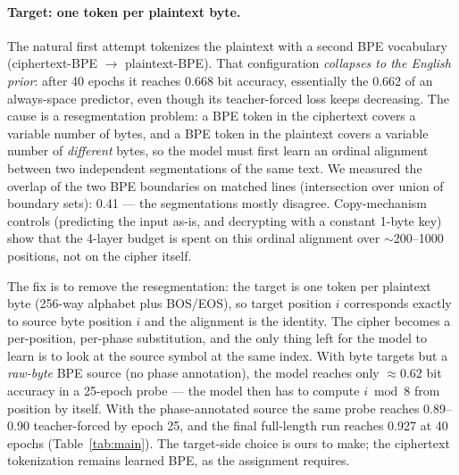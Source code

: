 \documentclass[11pt]{article}
\begin{document}
\paragraph{Target: one token per plaintext byte.}
The natural first attempt tokenizes the plaintext with a second BPE vocabulary
(ciphertext-BPE $\to$ plaintext-BPE). That configuration \emph{collapses to the
English prior}: after 40 epochs it reaches 0.668 bit accuracy, essentially the
0.662 of an always-space predictor, even though its teacher-forced loss keeps
decreasing. The cause is a resegmentation problem: a BPE token in the ciphertext
covers a variable number of bytes, and a BPE token in the plaintext covers a
variable number of \emph{different} bytes, so the model must first learn an
ordinal alignment between two independent segmentations of the same text. We
measured the overlap of the two BPE boundaries on matched lines (intersection
over union of boundary sets): 0.41 --- the segmentations mostly disagree.
Copy-mechanism controls (predicting the input as-is, and decrypting with a
constant 1-byte key) show that the 4-layer budget is spent on this ordinal
alignment over $\sim$200--1000 positions, not on the cipher itself.

The fix is to remove the resegmentation: the target is one token per plaintext
byte (256-way alphabet plus BOS/EOS), so target position $i$ corresponds exactly
to source byte position $i$ and the alignment is the identity. The cipher becomes
a per-position, per-phase substitution, and the only thing left for the model to
learn is to look at the source symbol at the same index. With byte targets but a
\emph{raw-byte} BPE source (no phase annotation), the model reaches only
$\approx$0.62 bit accuracy in a 25-epoch probe --- the model then has to compute
$i \bmod 8$ from position by itself. With the phase-annotated source the same
probe reaches 0.89--0.90 teacher-forced by epoch 25, and the final full-length
run reaches 0.927 at 40 epochs (Table~\ref{tab:main}). The target-side choice is ours to make; the ciphertext
tokenization remains learned BPE, as the assignment requires.
\end{document}
